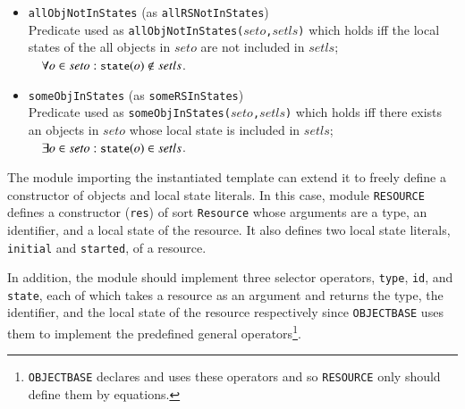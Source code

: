 \documentclass[12pt]{report}
\newcommand{\mbstt}[1]{\mbox{\small{\tt {#1}}}}
\newcommand{\stt}[1]{{\small{\tt {#1}}}}
\begin{document}
\begin{itemize}
\item \stt{allObjNotInStates} (as \stt{allRSNotInStates})\\
  Predicate used as \stt{allObjNotInStates($seto$,$setls$)} which holds iff
  the local states of the all objects in $seto$ are not included
  in $setls$;\\$~~~~\forall o\in seto:\mbstt{state}(o)\not\in setls$.
\item \stt{someObjInStates} (as \stt{someRSInStates})\\ 
  Predicate used as \stt{someObjInStates($seto$,$setls$)} which holds
  iff there exists an objects in $seto$ whose local state is included
  in $setls$;\\$~~~~\exists o\in seto:\mbstt{state}(o)\in setls$.
\end{itemize}

The module importing the instantiated template can extend it to
freely define a constructor of objects and local state literals.  In
this case, module {\tt RESOURCE} defines a constructor ({\tt res}) of
sort {\tt Resource} whose arguments are a type, an identifier, and a
local state of the resource. It also defines two local state literals,
{\tt initial} and {\tt started}, of a resource.

In addition, the module should implement three selector operators,
{\tt type}, {\tt id}, and {\tt state}, each of which takes a resource
as an argument and returns the type, the identifier, and the local
state of the resource respectively since {\tt OBJECTBASE} uses them to
implement the predefined general operators\footnote{{\tt OBJECTBASE}
  declares and uses these operators and so {\tt RESOURCE} only should
  define them by equations.}.
\end{document}
